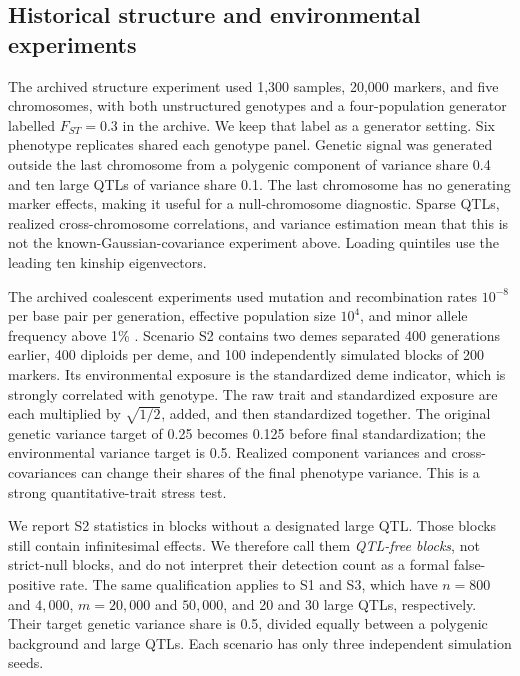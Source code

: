 \documentclass[11pt]{article}
\begin{document}
\subsection{Historical structure and environmental experiments}
\label{sec:historicaldesign}

The archived structure experiment used 1,300 samples, 20,000 markers,
and five chromosomes, with both unstructured genotypes and a
four-population generator labelled $F_{ST}=0.3$ in the archive. We
keep that label as a generator setting. Six phenotype replicates shared each genotype
panel. Genetic signal was generated outside the last chromosome from
a polygenic component of variance share 0.4 and ten large QTLs of
variance share 0.1. The last chromosome has no generating marker
effects, making it useful for a null-chromosome diagnostic. Sparse QTLs,
realized cross-chromosome correlations, and variance estimation mean
that this is not the known-Gaussian-covariance experiment above.
Loading quintiles use the leading ten kinship eigenvectors.

The archived coalescent experiments used mutation and recombination
rates $10^{-8}$ per base pair per generation, effective population size
$10^4$, and minor allele frequency above 1\%
\citep{kelleher2016,baumdicker2022}. Scenario S2 contains two demes
separated 400 generations earlier, 400 diploids per deme, and 100
independently simulated blocks of 200 markers. Its environmental
exposure is the standardized deme indicator, which is strongly correlated
with genotype.
The raw trait and standardized exposure are each multiplied by
$\sqrt{1/2}$, added, and then standardized together. The original genetic
variance target of 0.25 becomes 0.125 before final standardization; the
environmental variance target is 0.5. Realized component variances and
cross-covariances can change their shares of the final phenotype variance.
This is a strong quantitative-trait stress test.

We report S2 statistics in blocks without a designated large QTL. Those
blocks still contain infinitesimal effects. We therefore call them
\emph{QTL-free blocks}, not strict-null blocks, and do not interpret
their detection count as a formal false-positive rate. The same
qualification applies to S1 and S3, which have $n=800$ and $4,000$,
$m=20,000$ and $50,000$, and 20 and 30 large QTLs, respectively.
Their target genetic variance share is 0.5, divided equally between a
polygenic background and large QTLs. Each scenario has only three
independent simulation seeds.
\end{document}
